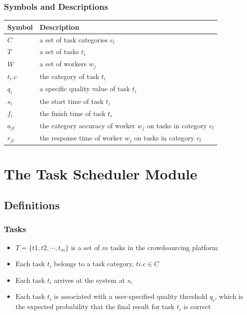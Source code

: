 \documentclass[UTF8]{beamer}
\begin{document}
\begin{frame}
    \frametitle{Symbols and Descriptions}
    \begin{center}
        \begin{tabular}{ll}
        \hline
        Symbol & Description \\
        \hline
        $C$ &  a set of task categories $c_i$ \\  
        $T$ &  a set of tasks $t_i$  \\
        $W$ &  a set of workers $w_j$ \\
        $t_i.c$ &  the category of task $t_i$ \\
        $q_i$ &  a speciﬁc quality value of task $t_i$ \\
        $s_i$ &  the start time of task $t_i$ \\
        $f_i$ &  the ﬁnish time of task $t_i$ \\
        $a_{jl}$ & the category accuracy of worker $w_j$ on tasks in category $c_l$ \\
        $r_{jl}$ & the response time of worker $w_j$ on tasks in category $c_l$\\
        \hline
        \end{tabular}
        \end{center}
\end{frame}

\section{The Task Scheduler Module}
\subsection{Definitions}

\begin{frame}
    \frametitle{Tasks}
    \begin{itemize}
        \item $T = \{t1, t2, \cdots, t_m \}$ is a set of $m$ tasks in the crowdsourcing platform
        \item Each task $t_i$ belongs to a task category, $ti.c \in C$
        \item Each task $t_i$ arrives at the system at $s_i$
        \item Each task $t_i$ is associated with a user-speciﬁed quality 
        threshold $q_i$, which is the expected probability that the final
        result for task $t_i$ is correct
    \end{itemize}
\end{frame}
\end{document}
